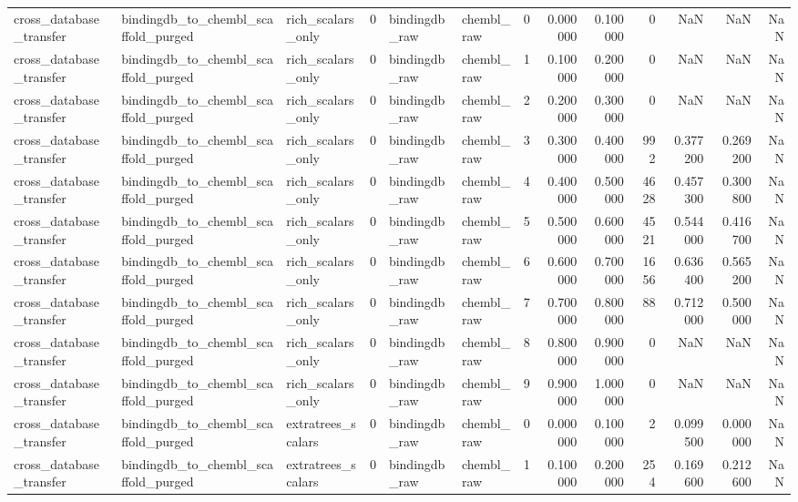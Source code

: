 \begin{longtable}{lllrllrrrrrrr}
cross\_database\_transfer & bindingdb\_to\_chembl\_scaffold\_purged & rich\_scalars\_only & 0 & bindingdb\_raw & chembl\_raw & 0 & 0.000000 & 0.100000 & 0 & NaN & NaN & NaN \\
cross\_database\_transfer & bindingdb\_to\_chembl\_scaffold\_purged & rich\_scalars\_only & 0 & bindingdb\_raw & chembl\_raw & 1 & 0.100000 & 0.200000 & 0 & NaN & NaN & NaN \\
cross\_database\_transfer & bindingdb\_to\_chembl\_scaffold\_purged & rich\_scalars\_only & 0 & bindingdb\_raw & chembl\_raw & 2 & 0.200000 & 0.300000 & 0 & NaN & NaN & NaN \\
cross\_database\_transfer & bindingdb\_to\_chembl\_scaffold\_purged & rich\_scalars\_only & 0 & bindingdb\_raw & chembl\_raw & 3 & 0.300000 & 0.400000 & 992 & 0.377200 & 0.269200 & NaN \\
cross\_database\_transfer & bindingdb\_to\_chembl\_scaffold\_purged & rich\_scalars\_only & 0 & bindingdb\_raw & chembl\_raw & 4 & 0.400000 & 0.500000 & 4628 & 0.457300 & 0.300800 & NaN \\
cross\_database\_transfer & bindingdb\_to\_chembl\_scaffold\_purged & rich\_scalars\_only & 0 & bindingdb\_raw & chembl\_raw & 5 & 0.500000 & 0.600000 & 4521 & 0.544000 & 0.416700 & NaN \\
cross\_database\_transfer & bindingdb\_to\_chembl\_scaffold\_purged & rich\_scalars\_only & 0 & bindingdb\_raw & chembl\_raw & 6 & 0.600000 & 0.700000 & 1656 & 0.636400 & 0.565200 & NaN \\
cross\_database\_transfer & bindingdb\_to\_chembl\_scaffold\_purged & rich\_scalars\_only & 0 & bindingdb\_raw & chembl\_raw & 7 & 0.700000 & 0.800000 & 88 & 0.712000 & 0.500000 & NaN \\
cross\_database\_transfer & bindingdb\_to\_chembl\_scaffold\_purged & rich\_scalars\_only & 0 & bindingdb\_raw & chembl\_raw & 8 & 0.800000 & 0.900000 & 0 & NaN & NaN & NaN \\
cross\_database\_transfer & bindingdb\_to\_chembl\_scaffold\_purged & rich\_scalars\_only & 0 & bindingdb\_raw & chembl\_raw & 9 & 0.900000 & 1.000000 & 0 & NaN & NaN & NaN \\
cross\_database\_transfer & bindingdb\_to\_chembl\_scaffold\_purged & extratrees\_scalars & 0 & bindingdb\_raw & chembl\_raw & 0 & 0.000000 & 0.100000 & 2 & 0.099500 & 0.000000 & NaN \\
cross\_database\_transfer & bindingdb\_to\_chembl\_scaffold\_purged & extratrees\_scalars & 0 & bindingdb\_raw & chembl\_raw & 1 & 0.100000 & 0.200000 & 254 & 0.169600 & 0.212600 & NaN \\

\end{longtable}
